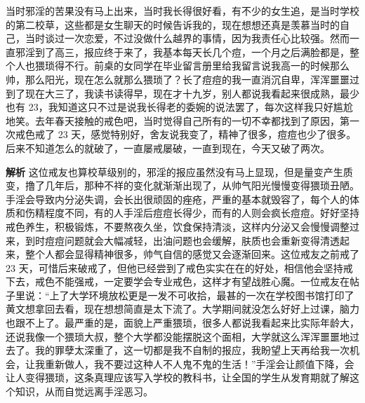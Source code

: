 \begin{case}
    当时邪淫的苦果没有马上出来，当时我长得很好看，有不少的女生追，是当时学校的第二校草，这些都是女生聊天的时候告诉我的，现在想想还真是羡慕当时的自己，当时谈过一次恋爱，不过没做什么越界的事情，因为我责任心比较强。然而一直邪淫到了高三，报应终于来了，我基本每天长几个痘，一个月之后满脸都是，整个人也猥琐得不行。前桌的女同学在毕业留言册里给我留言说我高一的时候那么帅，那么阳光，现在怎么就那么猥琐了？长了痘痘的我一直消沉自卑，浑浑噩噩过到了现在大三了，我读书读得早，现在才十九岁，别人都说我看起来很成熟，最少也有 23，我知道这只不过是说我长得老的委婉的说法罢了，每次这样我只好尴尬地笑。去年春天接触的戒色吧，当时觉得自己所有的一切不幸都找到了原因，第一次戒色戒了 23 天，感觉特别好，舍友说我变了，精神了很多，痘痘也少了很多。后来不知道怎么的就破了，一直屡戒屡破，一直到现在，今天又破了两次。

    \textbf{解析} 这位戒友也算校草级别的，邪淫的报应虽然没有马上显现，但是量变产生质变，撸了几年后，那种不祥的变化就渐渐出现了，从帅气阳光慢慢变得猥琐丑陋。手淫会导致内分泌失调，会长出很顽固的痤疮，严重的基本就毁容了，每个人的体质和伤精程度不同，有的人手淫后痘痘长得少，而有的人则会疯长痘痘。好好坚持戒色养生，积极锻炼，不要熬夜久坐，饮食保持清淡，这样内分泌又会慢慢调整过来，到时痘痘问题就会大幅减轻，出油问题也会缓解，肤质也会重新变得清透起来，整个人都会显得精神很多，帅气自信的感觉又会逐渐回来。这位戒友之前戒了 23 天，可惜后来破戒了，但他已经尝到了戒色实实在在的好处，相信他会坚持戒下去，戒色不能强戒，一定要学会专业戒色，这样才有望战胜心魔。一位戒友在帖子里说：“上了大学环境放松更是一发不可收拾，最甚的一次在学校图书馆打印了黄文想拿回去看，现在想想简直是太下流了。大学期间就没怎么好好上过课，脑力也跟不上了。最严重的是，面貌上严重猥琐，很多人都说我看起来比实际年龄大，还说我像一个猥琐大叔，整个大学都没能摆脱这个面相，大学就这么浑浑噩噩地过去了。我的罪孽太深重了，这一切都是我不自制的报应，我盼望上天再给我一次机会，让我重新做人，我不要过这种人不人鬼不鬼的生活！”手淫会让颜值下降，会让人变得猥琐，这条真理应该写入学校的教科书，让全国的学生从发育期就了解这个知识，从而自觉远离手淫恶习。
\end{case}

